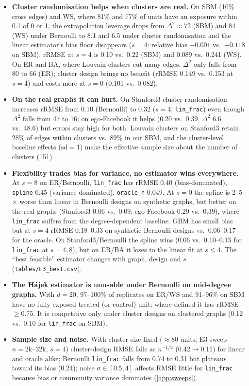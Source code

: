 \documentclass{article}
\theoremstyle{plain}
\theoremstyle{remark}
\begin{document}
\begin{itemize}
\item \textbf{Cluster randomisation helps when clusters are real.} On SBM (10\% cross edges) and WS, where 81\% and 77\% of units have an exposure within 0.1 of 0 or 1, the extrapolation leverage drops from $\Delta^2\approx72$ (SBM) and 84 (WS) under Bernoulli to 8.1 and 6.5 under cluster randomisation and the linear estimator's bias floor disappears ($s=4$: relative bias $-0.001$ vs.\ $+0.118$ on SBM). rRMSE at $s=4$ is 0.10 vs.\ 0.22 (SBM) and 0.089 vs.\ 0.241 (WS). On ER and BA, where Louvain clusters cut many edges, $\Delta^2$ only falls from 80 to 66 (ER); cluster design brings no benefit (rRMSE 0.149 vs.\ 0.153 at $s=4$) and costs more at $s=0$ (0.101 vs.\ 0.082).
\item \textbf{On the real graphs it can hurt.} On Stanford3 cluster randomisation increases rRMSE from 0.10 (Bernoulli) to 0.32 ($s=4$; \texttt{lin\_frac}) even though $\Delta^2$ falls from 47 to 16; on ego-Facebook it helps (0.20 vs.\ 0.39, $\Delta^2$ 6.6 vs.\ 48.6) but errors stay high for both. Louvain clusters on Stanford3 retain 28\% of edges within clusters vs.\ 89\% in our SBM, and the cluster-level baseline effects ($\mathrm{sd}=1$) make the effective sample size about the number of clusters (151).
\item \textbf{Flexibility trades bias for variance, no estimator wins everywhere.} At $s=8$ on ER/Bernoulli, \texttt{lin\_frac} has rRMSE 0.40 (bias-dominated), \texttt{spline} 0.45 (variance-dominated), \texttt{oracle\_h} 0.049. At $s=0$ the spline is 2--5$\times$ worse than linear in Bernoulli designs on synthetic graphs, but better on the real graphs (Stanford3 0.06 vs.\ 0.09; ego-Facebook 0.29 vs.\ 0.39), where \texttt{lin\_frac} suffers from the degree-dependent baseline. GBM has small bias but at $s=4$ rRMSE 0.18--0.33 on synthetic Bernoulli designs vs.\ 0.06--0.17 for the oracle. On Stanford3/Bernoulli the spline wins (0.06 vs.\ 0.10--0.15 for \texttt{lin\_frac} at $s=4,8$), but on ER/BA it loses to the linear fit at $s\le4$. The ``best feasible'' estimator changes with graph, design and $s$ (\texttt{tables/E3\_best.csv}).
\item \textbf{The Hájek estimator is unusable under Bernoulli on mid-degree graphs.} With $d=20$, 97--100\% of replicates on ER/WS and 91--96\% on SBM have no fully exposed treated (or control) unit; where defined it has rRMSE $\ge0.75$. It is competitive only under cluster designs on clustered graphs (0.12 vs.\ 0.10 for \texttt{lin\_frac} on SBM).
\item \textbf{Sample size and noise.} With cluster size fixed ($\approx 80$ units; E3 sweep $n=2$k--32k, $s=4$) cluster-design RMSE falls as $n^{-1/2}$ (0.42$\to$0.11) for linear and oracle alike; Bernoulli \texttt{lin\_frac} falls from 0.74 to 0.31 but plateaus toward its bias (0.24); noise $\sigma\in[0.5,4]$ affects RMSE little for \texttt{lin\_frac} because bias or community variance dominates (\cref{app:sweeps}).
\end{itemize}
\end{document}
